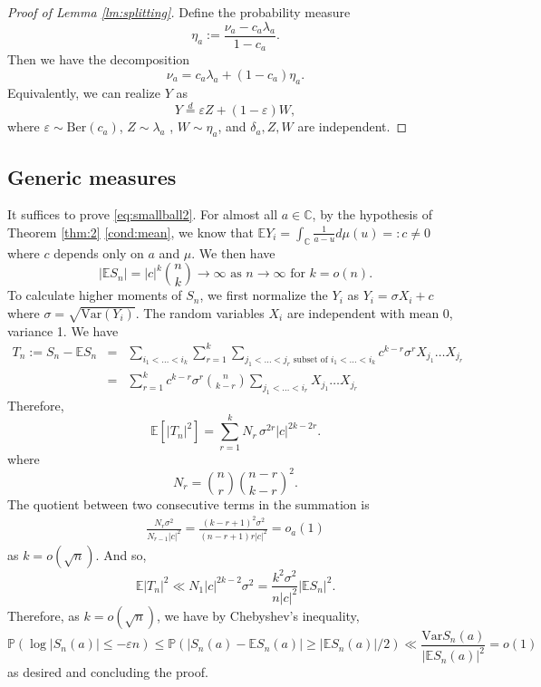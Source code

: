\documentclass[12pt, reqno]{amsart}
\theoremstyle{plain}
\theoremstyle{definition}
\newcommand\C{{\mathbb{C}}}
\renewcommand\P{{\mathbb{P}}}
\newcommand\E{{\mathbb{E}}}
\newcommand\Var{\mathrm{Var}}
\newcommand{\ep}{\varepsilon}
\begin{document}
\begin{proof} [Proof of Lemma \ref{lm:splitting}]
 	\medskip
 	
 	Define the probability measure
 	\[
 	\eta_a := \frac{\nu_a - c_a \lambda_a}{1 - c_a}.
 	\]
 	Then we have the decomposition
 	\[
 	\nu_a = c_a \lambda_a + (1-c_a)\eta_a.
 	\]
 	Equivalently, we can realize $Y$ as
 	\[
 	Y \overset{d}{=} \ep Z + (1-\ep) W,
 	\]
 	where $\ep  \sim \mathrm{Ber}(c_a)$, $Z \sim \lambda_a$ , $W \sim \eta_a$, and $\delta_a, Z, W$ are independent.
 \end{proof}
 
 
 \subsection{Generic measures} 
  It suffices to prove \eqref{eq:smallball2}. For almost all $a\in \C$, by the hypothesis of Theorem \ref{thm:2} \eqref{cond:mean}, we know that
 $\E Y_i=\int_{\C} \frac{1}{a-u}d\mu(u)=: c\neq 0$
 where $c$ depends only on $a$ and $\mu$. We then have
 $$|\E S_n| = |c|^{k}{n\choose k}\to \infty\text{ as } n\to\infty \text{ for $k=o(n)$}.$$
 To calculate higher moments of $S_n$, we first normalize the  $Y_i$ as $Y_i  = \sigma X_i +c$ where $\sigma = \sqrt{\Var(Y_i)}$. The random variables $X_i$ are independent with mean 0, variance 1. We have
 \begin{eqnarray*}
 	T_n:= S_n -\E S_n &=& \sum_{i_1<\dots<i_k}  \sum_{r=1}^{k} \sum_{j_1<\dots<j_r \text{ subset of } i_1<\dots <i_k}c^{k-r} \sigma^{r} X_{j_1}\dots X_{j_r}\\
 	&=& \sum_{r=1}^{k} c^{k-r} \sigma^{r} {n\choose {k-r}}\sum_{j_1<\dots<i_r} X_{j_1}\dots X_{j_r}
 \end{eqnarray*}
 Therefore,
 \[
 \mathbb E[|T_n|^2]=\sum_{r=1}^k N_r\, \sigma^{2r} |c|^{2k-2r}.
 \]
 where
 \[
 N_r=\binom{n}{r}\binom{n-r}{k-r}^{2}.
 \]
 The quotient between two consecutive terms in the summation is 
 \begin{eqnarray*}
 	\frac{N_{r} \sigma^2}{N_{r-1}|c|^{2}} = \frac{(k-r+1)^{2}\sigma^{2}}{(n-r+1)r|c|^{2}}=o_{a}(1)
 \end{eqnarray*}
 as $k = o(\sqrt n)$. And so,
 \begin{equation}
 	\E |T_n|^{2}\ll N_1|c|^{2k-2}\sigma^2 = \frac{k^{2}\sigma^2}{n|c|^{2}} |\E S_n|^{2}.\label{eq:second:moment}
 \end{equation}
 Therefore, as $k = o(\sqrt n)$, we have by Chebyshev's inequality,
 $$\P(\log |S_n(a)| \le -\ep n) \le \P(|S_n(a) - \E S_n(a)|\ge |\E S_n(a)|/2)\ll \frac{\Var S_n(a)}{|\E S_n(a)|^{2}}=o(1)$$
 as desired and concluding the proof.
 
\end{document}

